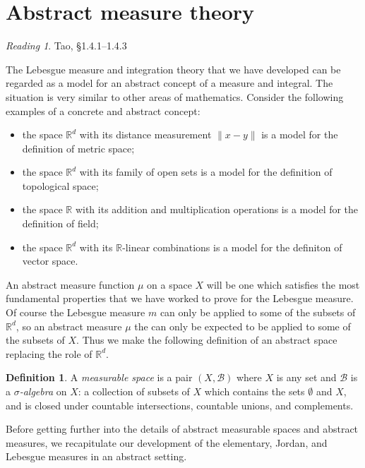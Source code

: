 \documentclass[11pt,oneside]{amsbook}
\newcommand{\RR}{{\mathbb R}}
\theoremstyle{definition}
\theoremstyle{plain}
\theoremstyle{definition}
\newtheorem{defn}[thm]{Definition}
\theoremstyle{remark}
\newtheorem*{reading}{Reading}
\numberwithin{equation}{section}
\numberwithin{figure}{section}
\begin{document}
\section{Abstract measure theory}

\begin{reading}
  Tao, \S 1.4.1--1.4.3
\end{reading}

The Lebesgue measure and integration theory that we have developed can be regarded as a model for an abstract concept of a measure and integral. The situation is very similar to other areas of mathematics. Consider the following examples of a concrete and abstract concept:
\begin{itemize}
\item the space $\RR^d$ with its distance measurement $\|x-y\|$ is a model for the definition of metric space;
\item the space $\RR^d$ with its family of open sets is a model for the definition of topological space;
\item the space $\RR$ with its addition and multiplication operations is a model for the definition of field;
\item the space $\RR^d$ with its $\RR$-linear combinations is a model for the definiton of vector space.
\end{itemize}

An abstract measure function $\mu$ on a space $X$ will be one which satisfies the most fundamental properties that we have worked to prove for the Lebesgue measure. Of course the Lebesgue measure $m$ can only be applied to some of the subsets of $\RR^d$, so an abstract measure $\mu$ the can only be expected to be applied to some of the subsets of $X$. Thus we make the following definition of an abstract space replacing the role of $\RR^d$.

\begin{defn}
  A \emph{measurable space} is a pair $(X,\mathcal B)$ where $X$ is any set and $\mathcal B$ is a \emph{$\sigma$-algebra} on $X$: a collection of subsets of $X$ which contains the sets $\emptyset$ and $X$, and is closed under countable intersections, countable unions, and complements.
\end{defn}

Before getting further into the details of abstract measurable spaces and abstract measures, we recapitulate our development of the elementary, Jordan, and Lebesgue measures in an abstract setting.
\end{document}
